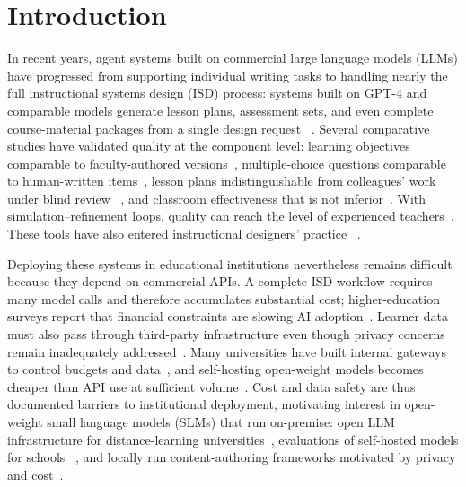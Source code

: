 \section{Introduction}
\label{sec:introduction}

In recent years, agent systems built on commercial large language models (LLMs)
have progressed from supporting individual writing tasks to handling nearly the
full instructional systems design (ISD) process: systems built on GPT-4 and
comparable models generate lesson plans, assessment sets, and even complete
course-material packages from a single design request
~\cite{yao2025instructionalagents,zhang2025eduplanner,agentlesson2026,zeng2026coma,hu2024teachingplan}.
Several comparative studies have validated quality at the component level:
learning objectives comparable to faculty-authored versions~\cite{doyle2025objectives},
multiple-choice questions comparable to human-written items~\cite{doughty2024mcq},
lesson plans indistinguishable from colleagues' work under blind review
~\cite{cooper2026indistinguishable}, and classroom effectiveness that is not
inferior~\cite{karaman2024chatgptlesson}. With simulation--refinement loops,
quality can reach the level of experienced teachers~\cite{hu2025teachingsim}.
These tools have also entered instructional designers' practice
~\cite{yang2025idpractice,lessonplanner2024}.

Deploying these systems in educational institutions nevertheless remains difficult
because they depend on commercial APIs. A complete ISD workflow requires many model
calls and therefore accumulates substantial cost; higher-education surveys report
that financial constraints are slowing AI adoption~\cite{robert2025educause}.
Learner data must also pass through third-party infrastructure even though privacy
concerns remain inadequately addressed~\cite{yan2024ethical}. Many universities
have built internal gateways to control budgets and data~\cite{mithun2025aiverde},
and self-hosting open-weight models becomes cheaper than API use at sufficient
volume~\cite{pan2025onpremise}. Cost and data safety are thus documented barriers
to institutional deployment, motivating interest in open-weight small language
models (SLMs) that run on-premise: open LLM infrastructure for distance-learning
universities~\cite{zesch2024flexi}, evaluations of self-hosted models for schools
~\cite{chan2026bigger}, and locally run content-authoring frameworks motivated by
privacy and cost~\cite{reza2025smallmodels}.

